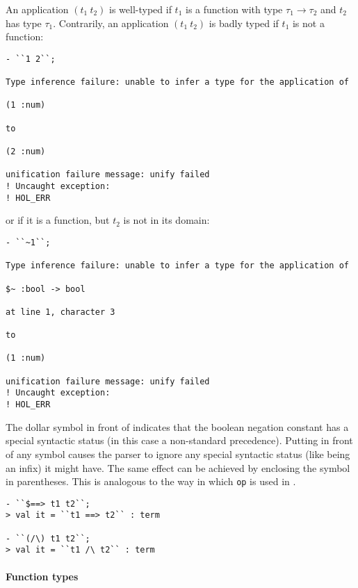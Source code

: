 An application $(t_1\ t_2)$ is well-typed if $t_1$ is a function with type $\tau_1 \to \tau_2$ and $t_2$ has type $\tau_1$.
Contrarily, an application $(t_1\ t_2)$ is badly typed if $t_1$ is not a function:

\begin{session}
\begin{verbatim}
- ``1 2``;

Type inference failure: unable to infer a type for the application of

(1 :num)

to

(2 :num)

unification failure message: unify failed
! Uncaught exception:
! HOL_ERR
\end{verbatim}
\end{session}

\noindent or if it is a function, but $t_2$ is not in its domain:

\begin{session}
\begin{verbatim}
- ``~1``;

Type inference failure: unable to infer a type for the application of

$~ :bool -> bool

at line 1, character 3

to

(1 :num)

unification failure message: unify failed
! Uncaught exception:
! HOL_ERR
\end{verbatim}
\end{session}

The dollar symbol in front of \holtxt{\td} indicates that the boolean negation constant has a special syntactic status (in this case a non-standard precedence).
Putting \holtxt{\$} in front of any symbol causes the parser to ignore any special syntactic status (like being an infix) it might have.
The same effect can be achieved by enclosing the symbol in parentheses.
This is analogous to the way in which \texttt{op} is used in \ML.

\begin{session}
\begin{verbatim}
- ``$==> t1 t2``;
> val it = ``t1 ==> t2`` : term

- ``(/\) t1 t2``;
> val it = ``t1 /\ t2`` : term
\end{verbatim}
\end{session}

\paragraph{Function types}

